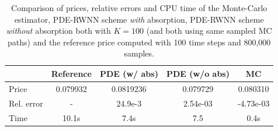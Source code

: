\begin{table}[hbt!]
    \centering
    \begin{tabular}{l|c|c|c|c}
        & Reference & PDE (w/ abs) & PDE (w/o abs) & MC \\
        \hline
        Price & 0.079932 & 0.0819236 & 0.079729 & 0.080310 \\
        \hline
        Rel. error & - & 24.9e-3 & 2.54e-03 & -4.73e-03 \\
        \hline
        Time & 10.1s & 7.4s & 7.5 & 0.4s
    \end{tabular}
    \caption{Comparison of prices, relative errors and CPU time of the Monte-Carlo estimator, PDE-RWNN scheme \textit{with} absorption, PDE-RWNN scheme \textit{without} absorption both with $K = 100$ (and both using same sampled MC paths) and the reference price computed with 100 time steps and 800,000 samples.}
    \label{tab:rB_vanilla_errors}
\end{table}



